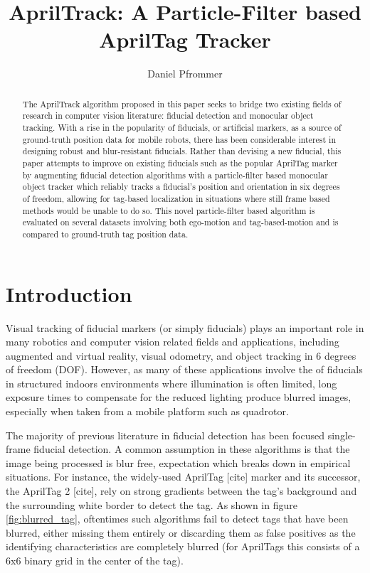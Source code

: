 \documentclass[letterpaper, 10 pt, conference]{ieeeconf}
\title{\textbf{AprilTrack: A Particle-Filter based AprilTag Tracker}}
\author{Daniel Pfrommer}
\date{}
\begin{document}
\maketitle

\begin{abstract}

	The AprilTrack algorithm proposed in this paper seeks to bridge two existing fields of research in computer vision literature: fiducial detection and monocular object tracking. With a rise in the popularity of fiducials, or artificial markers, as a source of ground-truth position data for mobile robots, there has been considerable interest in designing robust and blur-resistant fiducials. Rather than devising a new fiducial, this paper attempts to improve on existing fiducials such as the popular AprilTag marker by augmenting fiducial detection algorithms with a particle-filter based monocular object tracker which reliably tracks a fiducial's position and orientation in six degrees of freedom, allowing for tag-based localization in situations where still frame based methods would be unable to do so. This novel particle-filter based algorithm is evaluated on several datasets involving both ego-motion and tag-based-motion and is compared to ground-truth tag position data.
	
\end{abstract}

\section{Introduction}


Visual tracking of fiducial markers (or simply fiducials) plays an important role in many robotics and computer vision related fields and applications, including augmented and virtual reality, visual odometry, and object tracking in 6 degrees of freedom (DOF). However, as many of these applications involve the of fiducials in structured indoors environments where illumination is often limited, long exposure times to compensate for the reduced lighting produce blurred images, especially when taken from a mobile platform such as quadrotor.


 The majority of previous literature in fiducial detection has been focused single-frame fiducial detection. A common assumption in these algorithms is that the image being processed is blur free, expectation which breaks down in empirical situations. For instance, the widely-used AprilTag [cite] marker and its successor, the AprilTag 2 [cite], rely on strong gradients between the tag's background and the surrounding white border to detect the tag. As shown in figure \ref{fig:blurred_tag}, oftentimes such algorithms fail to detect tags that have been blurred, either missing them entirely or discarding them as false positives as the identifying characteristics are completely blurred (for AprilTags this consists of a 6x6 binary grid in the center of the tag).
 
\end{document}
